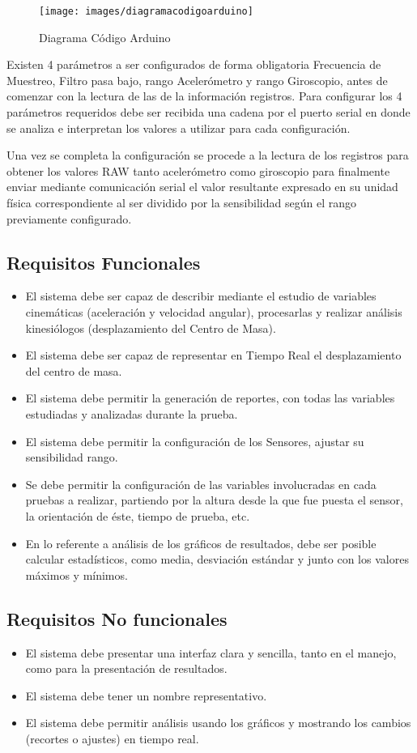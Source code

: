 \documentclass[12pt,a4paper]{article}
\begin{document}
\begin{figure}[H]
	\centering
	\texttt{[image: images/diagramacodigoarduino]}
	\caption{Diagrama Código Arduino}
	\label{fig:arduinocode}
\end{figure}

Existen 4 parámetros a ser configurados de forma obligatoria Frecuencia de Muestreo, Filtro pasa bajo, rango Acelerómetro y rango Giroscopio, antes de comenzar con la lectura de las de la información registros.
Para configurar los 4 parámetros requeridos debe ser recibida una cadena por el puerto serial en donde se analiza e interpretan los valores a utilizar para cada configuración. 

Una vez se completa la configuración se procede a la lectura de los registros para obtener los valores RAW tanto acelerómetro como giroscopio para finalmente enviar mediante comunicación serial el valor resultante expresado en su unidad física correspondiente al ser dividido por la sensibilidad según el rango previamente configurado.

\subsection{Requisitos Funcionales}
\begin{itemize}
	\item El sistema debe ser capaz de describir mediante el estudio de variables cinemáticas (aceleración y velocidad angular), procesarlas y realizar análisis kinesiólogos (desplazamiento del Centro de Masa).
	\item El sistema debe ser capaz de representar en Tiempo Real el desplazamiento del centro de masa.
	\item El sistema debe permitir la generación de reportes, con todas las variables estudiadas y analizadas durante la prueba.
	\item El sistema debe permitir la configuración de los Sensores, ajustar su sensibilidad rango.
	\item Se debe permitir la configuración de las variables involucradas en cada pruebas a realizar, partiendo por la altura desde la que fue puesta el sensor, la orientación de éste, tiempo de prueba, etc.
	\item En lo referente a análisis de los gráficos de resultados, debe ser posible calcular estadísticos, como media, desviación estándar y junto con los valores máximos y mínimos.
\end{itemize} 

\subsection{Requisitos No funcionales}
\begin{itemize}
	\item El sistema debe presentar una interfaz clara y sencilla, tanto en el manejo, como para la presentación de resultados.
	\item El sistema debe tener un nombre representativo.
	\item El sistema debe permitir análisis usando los gráficos y mostrando los cambios (recortes o ajustes) en tiempo real.
\end{itemize}
\end{document}
